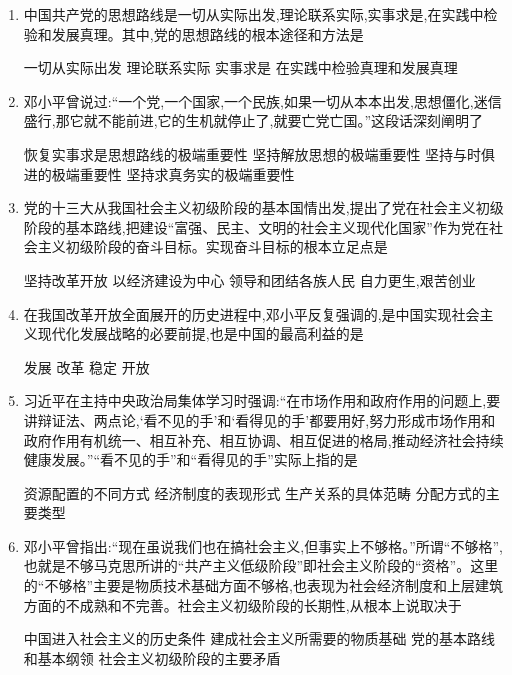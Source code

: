 \documentclass[12pt, a4paper, oneside, UTF8]{ctexbook}
\begin{document}
\begin{enumerate}
    \item 中国共产党的思想路线是一切从实际出发,理论联系实际,实事求是,在实践中检验和发展真理。其中,党的思想路线的根本途径和方法是
    \begin{choices}[2]
    \task 一切从实际出发
    \task 理论联系实际
    \task 实事求是
    \task 在实践中检验真理和发展真理
    \end{choices}

    \item 邓小平曾说过:“一个党,一个国家,一个民族,如果一切从本本出发,思想僵化,迷信盛行,那它就不能前进,它的生机就停止了,就要亡党亡国。”这段话深刻阐明了
    \begin{choices}[1]
    \task 恢复实事求是思想路线的极端重要性
    \task 坚持解放思想的极端重要性
    \task 坚持与时俱进的极端重要性
    \task 坚持求真务实的极端重要性
    \end{choices}

    \item 党的十三大从我国社会主义初级阶段的基本国情出发,提出了党在社会主义初级阶段的基本路线,把建设“富强、民主、文明的社会主义现代化国家”作为党在社会主义初级阶段的奋斗目标。实现奋斗目标的根本立足点是
    \begin{choices}[1]
    \task 坚持改革开放
    \task 以经济建设为中心
    \task 领导和团结各族人民
    \task 自力更生,艰苦创业
    \end{choices}

    \item 在我国改革开放全面展开的历史进程中,邓小平反复强调的,是中国实现社会主义现代化发展战略的必要前提,也是中国的最高利益的是
    \begin{choices}[1]
    \task 发展
    \task 改革
    \task 稳定
    \task 开放
    \end{choices}

    \item 习近平在主持中央政治局集体学习时强调:“在市场作用和政府作用的问题上,要讲辩证法、两点论,‘看不见的手’和‘看得见的手’都要用好,努力形成市场作用和政府作用有机统一、相互补充、相互协调、相互促进的格局,推动经济社会持续健康发展。”“看不见的手”和“看得见的手”实际上指的是
    \begin{choices}[1]
    \task 资源配置的不同方式
    \task 经济制度的表现形式
    \task 生产关系的具体范畴
    \task 分配方式的主要类型
    \end{choices}

    \item 邓小平曾指出:“现在虽说我们也在搞社会主义,但事实上不够格。”所谓“不够格”,也就是不够马克思所讲的“共产主义低级阶段”即社会主义阶段的“资格”。这里的“不够格”主要是物质技术基础方面不够格,也表现为社会经济制度和上层建筑方面的不成熟和不完善。社会主义初级阶段的长期性,从根本上说取决于
    \begin{choices}[1]
    \task 中国进入社会主义的历史条件
    \task 建成社会主义所需要的物质基础
    \task 党的基本路线和基本纲领
    \task 社会主义初级阶段的主要矛盾
    \end{choices}


\end{enumerate}
\end{document}
